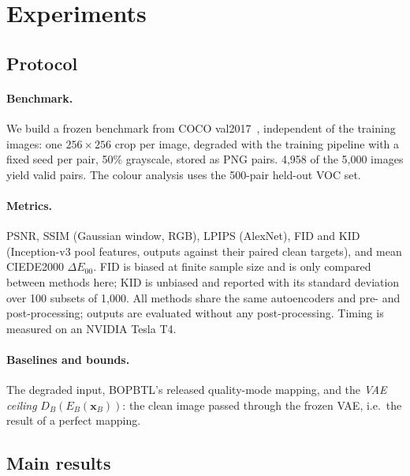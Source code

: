 \documentclass[10pt,twocolumn,letterpaper]{article}
\begin{document}
\section{Experiments}
\label{sec:exp}

\subsection{Protocol}
\paragraph{Benchmark.} We build a frozen benchmark from COCO val2017~\cite{lin2014coco}, independent of the training
images: one $256{\times}256$ crop per image, degraded with the training pipeline with a fixed seed per pair, 50\%
grayscale, stored as PNG pairs. 4{,}958 of the 5{,}000 images yield valid pairs. The colour analysis uses the 500-pair
held-out VOC set.

\paragraph{Metrics.} PSNR, SSIM (Gaussian window, RGB), LPIPS (AlexNet), FID and KID (Inception-v3 pool features, outputs
against their paired clean targets), and mean CIEDE2000 $\Delta E_{00}$. FID is biased at finite sample size and is only
compared between methods here; KID is unbiased and reported with its standard deviation over 100 subsets of 1{,}000.
All methods share the same autoencoders and pre- and post-processing; outputs are evaluated without any
post-processing. Timing is measured on an NVIDIA Tesla T4.

\paragraph{Baselines and bounds.} The degraded input, BOPBTL's released quality-mode mapping, and the \emph{VAE ceiling}
$D_B(E_B(\bm{x}_B))$: the clean image passed through the frozen VAE, i.e.\ the result of a perfect mapping.

\subsection{Main results}
\label{sec:main}
\end{document}
